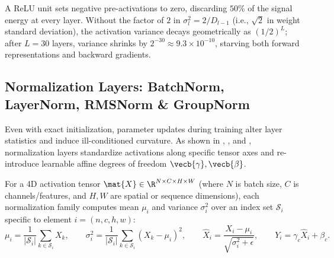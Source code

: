 \documentclass[../../../../master.tex]{subfiles}
\begin{document}
\begin{intuition}
A ReLU unit sets negative pre-activations to zero, discarding $50\%$ of the signal energy at every layer. Without the factor of $2$ in $\sigma_l^2 = 2/D_{l-1}$ (i.e., $\sqrt{2}$ in weight standard deviation), the activation variance decays geometrically as $(1/2)^L$; after $L = 30$ layers, variance shrinks by $2^{-30} \approx 9.3 \times 10^{-10}$, starving both forward representations and backward gradients.
\end{intuition}

\subsection{Normalization Layers: BatchNorm, LayerNorm, RMSNorm \& GroupNorm}
\label{sec:normres:normalization}

{\sloppy Even with exact initialization, parameter updates during training alter layer statistics and induce ill-conditioned curvature. As shown in , , and , normalization layers standardize activations along specific tensor axes and re-introduce learnable affine degrees of freedom $\vecb{\gamma}, \vecb{\beta}$.\par}

For a 4D activation tensor $\mat{X} \in \R^{N \times C \times H \times W}$ (where $N$ is batch size, $C$ is channels/features, and $H, W$ are spatial or sequence dimensions), each normalization family computes mean $\mu_i$ and variance $\sigma_i^2$ over an index set $\mathcal{S}_i$ specific to element $i = (n, c, h, w)$:
\begin{equation}
  \mu_i = \frac{1}{|\mathcal{S}_i|}\sum_{k \in \mathcal{S}_i} X_k, \qquad
  \sigma_i^2 = \frac{1}{|\mathcal{S}_i|}\sum_{k \in \mathcal{S}_i} (X_k - \mu_i)^2, \qquad
  \hat{X}_i = \frac{X_i - \mu_i}{\sqrt{\sigma_i^2 + \epsilon}}, \qquad
  Y_i = \gamma_c \hat{X}_i + \beta_c.
  \label{eq:normres:general_norm}
\end{equation}
\end{document}
